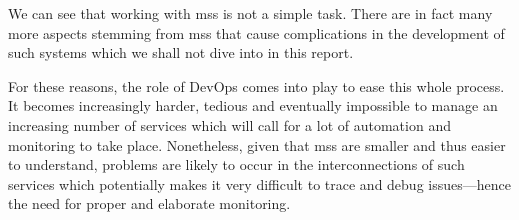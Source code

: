 We can see that working with \glspl{ms} is not a simple task.
\cite{ms-arch-study} There are in fact many more aspects stemming from
\glspl{ms} that cause complications in the development of such systems
\cite{ms-pains-gains} which we shall not dive into in this report.

For these reasons, the role of DevOps comes into play to ease this whole process.
It becomes increasingly harder, tedious and eventually impossible to
manage an increasing number of services which will call for a lot of
automation and monitoring to take place. Nonetheless, given that \glspl{ms} are
smaller and thus easier to understand, problems are likely to occur in
the interconnections of such services which potentially makes it very
difficult to trace and debug issues---hence the need for proper and
elaborate monitoring.


